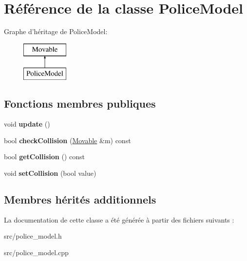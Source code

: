 \hypertarget{class_police_model}{\section{Référence de la classe Police\+Model}
\label{class_police_model}
}
Graphe d'héritage de Police\+Model\+:\begin{figure}[H]
\begin{center}
\leavevmode
\includegraphics[height=2.000000cm]{class_police_model}
\end{center}
\end{figure}
\subsection*{Fonctions membres publiques}
\begin{DoxyCompactItemize}
\item 
\hypertarget{class_police_model_a8dab4f46681b12594967a67b468c14a4}{void {\bfseries update} ()}\label{class_police_model_a8dab4f46681b12594967a67b468c14a4}

\item 
\hypertarget{class_police_model_ae1a02844b27fa14668a512567d6362c5}{bool {\bfseries check\+Collision} (\hyperlink{class_movable}{Movable} \&m) const }\label{class_police_model_ae1a02844b27fa14668a512567d6362c5}

\item 
\hypertarget{class_police_model_af110909806157216d40855a536a82470}{bool {\bfseries get\+Collision} () const }\label{class_police_model_af110909806157216d40855a536a82470}

\item 
\hypertarget{class_police_model_a0df221298bce8ce8a271939da60cae4a}{void {\bfseries set\+Collision} (bool value)}\label{class_police_model_a0df221298bce8ce8a271939da60cae4a}

\end{DoxyCompactItemize}
\subsection*{Membres hérités additionnels}


La documentation de cette classe a été générée à partir des fichiers suivants \+:\begin{DoxyCompactItemize}
\item 
src/police\+\_\+model.\+h\item 
src/police\+\_\+model.\+cpp\end{DoxyCompactItemize}
